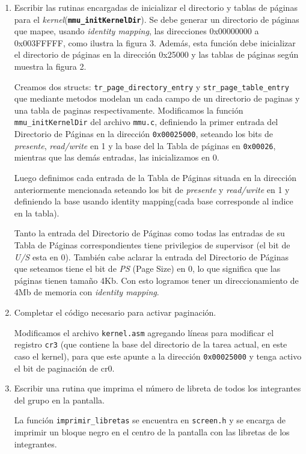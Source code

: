 \documentclass[a4paper]{article}
\begin{document}
 \begin{enumerate}[label=\alph*)]
 	
 	\item Escribir las rutinas encargadas de inicializar el directorio y tablas de páginas para el	\textit{kernel}(\texttt{\textbf{mmu_initKernelDir}}). Se debe generar un directorio de páginas que mapee, usando \textit{identity mapping}, las direcciones 0x00000000 a 0x003FFFFF, como ilustra la figura 3. Además, esta función debe inicializar el directorio de páginas en la dirección 0x25000 y las tablas de páginas según muestra la figura 2.
 	
 
 	Creamos dos structs: \texttt{tr\_page\_directory\_entry} y \texttt{str\_page\_table\_entry} que mediante metodos modelan un cada campo de un directorio de paginas y una tabla de paginas respectivamente.
 	Modificamos la función \texttt{mmu\_initKernelDir} del archivo \texttt{mmu.c}, definiendo la primer entrada del Directorio de P\'aginas en la direcci\'on \texttt{0x00025000}, seteando los bits de \textit{presente}, \textit{read/write} en 1 y la base del la Tabla de p\'aginas en \texttt{0x00026}, mientras que las demás entradas, las inicializamos en 0.
 	
 	Luego definimos cada entrada de la Tabla de P\'aginas situada en la direcci\'on anteriormente mencionada seteando los bit de \textit{presente} y \textit{read/write} en 1 y definiendo la base usando identity mapping(cada base corresponde al indice en la tabla). 
 	
 	Tanto la entrada del Directorio de P\'aginas como todas las entradas de su Tabla de P\'aginas correspondientes tiene privilegios de supervisor (el bit de \textit{U/S} esta en 0). Tambi\'en cabe aclarar la entrada del Directorio de P\'aginas que seteamos tiene el bit de \textit{PS} (Page Size) en 0, lo que significa que las p\'aginas tienen tama\~no 4Kb. Con esto logramos tener un direccionamiento de 4Mb de memoria con \textit{identity mapping}.
 	
 	\item Completar el código necesario para activar paginación.
 	
 	Modificamos el archivo \texttt{kernel.asm} agregando l\'ineas para modificar el registro \texttt{cr3} (que contiene la base del directorio de la tarea actual, en este caso el kernel), para que este apunte a la dirección \texttt{0x00025000} y tenga activo el bit de paginación de cr0.
 	
 	\item Escribir una rutina que imprima el número de libreta de todos los integrantes del grupo en la pantalla.
 	
 	
 	La funci\'on \texttt{imprimir\_libretas} se encuentra en \texttt{screen.h} y se encarga de imprimir un bloque negro en el centro de la pantalla con las libretas de los integrantes.

 \end{enumerate}
 
\end{document}
